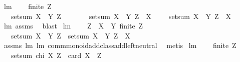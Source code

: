 \begin{isabellebody}
\ lm{}{}{}{\isacharcolon}\ \isanewline
\ \ \ {\isachardoublequoteopen}finite\ Z{\isachardoublequoteclose}\ \isanewline
\ \ \ {\isachardoublequoteopen}setsum\ {\isacharparenleft}X\ {\isacharless}{\isacharbar}\ Y{\isacharparenright}\ Z\ \ \ \ {\isacharequal}\ \ \ \ setsum\ {\isacharparenleft}X\ {\isacharless}{\isacharbar}\ Y{\isacharparenright}\ {\isacharparenleft}Z\ {\isacharminus}\ X{\isacharparenright}\ \ \ {\isacharplus}\ \ {\isacharparenleft}setsum\ {\isacharparenleft}X\ {\isacharless}{\isacharbar}\ Y{\isacharparenright}\ {\isacharparenleft}Z\ {\isasyminter}\ X{\isacharparenright}{\isacharparenright}{\isachardoublequoteclose}\ \isanewline
%
\isadelimproof
\ \ %
\endisadelimproof
%
\isatagproof
{}\isamarkupfalse%
\ lm{}{}{}\ assms\ \isamarkupfalse%
\ blast%
\endisatagproof
{\isafoldproof}%
%
\isadelimproof
\isanewline
%
\endisadelimproof
\isanewline
{}\isamarkupfalse%
\ lm{}{}{}{\isacharcolon}\ \isanewline
\ \ \ {\isachardoublequoteopen}Z\ {\isasymsubseteq}\ X\ {\isasymunion}\ Y{\isachardoublequoteclose}\ {\isachardoublequoteopen}finite\ Z{\isachardoublequoteclose}\ \isanewline
\ \ \ {\isachardoublequoteopen}setsum\ {\isacharparenleft}X\ {\isacharless}{\isacharbar}\ Y{\isacharparenright}\ Z\ {\isacharequal}\ setsum\ {\isacharparenleft}X\ {\isacharless}{\isacharbar}\ Y{\isacharparenright}\ {\isacharparenleft}Z\ {\isasyminter}\ X{\isacharparenright}{\isachardoublequoteclose}\ \isanewline
%
\isadelimproof
\ \ %
\endisadelimproof
%
\isatagproof
{}\isamarkupfalse%
\ assms\ lm{}{}{}\ lm{}{}{}\ comm{\isacharunderscore}monoid{\isacharunderscore}add{\isacharunderscore}class{\isachardot}add{\isachardot}left{\isacharunderscore}neutral\ \isamarkupfalse%
\ metis%
\endisatagproof
{\isafoldproof}%
%
\isadelimproof
\isanewline
%
\endisadelimproof
\isanewline
{}\isamarkupfalse%
\ lm{}{}{}{\isacharcolon}\ \isanewline
\ \ \ {\isachardoublequoteopen}finite\ Z{\isachardoublequoteclose}\ \isanewline
\ \ \ {\isachardoublequoteopen}setsum\ {\isacharparenleft}chi\ X{\isacharparenright}\ Z\ {\isacharequal}\ card\ {\isacharparenleft}X\ {\isasyminter}\ Z{\isacharparenright}{\isachardoublequoteclose}\ \isanewline
%
\isadelimproof
\ \ %
\endisadelimproof
%
\isatagproof

\end{isabellebody}
